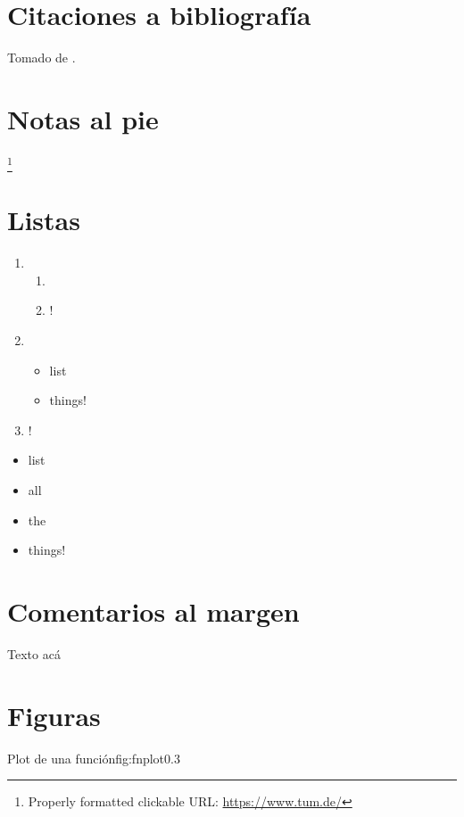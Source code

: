 
\section*{Citaciones a bibliografía}
\tinylipsum Tomado de \cite{latex}.

\section*{Notas al pie}
\tinylipsum \footnote{Properly formatted clickable URL: \url{https://www.tum.de/}}

\section*{Listas}
\tinylipsum

\tinylipsum
\begin{enumerate}
  \item \tinylipsum
    \begin{enumerate}
      \item \tinylipsum
      \item \tinylipsum!
    \end{enumerate}
  \item \tinylipsum
    \begin{itemize}
      \item list
      \item things!
    \end{itemize}
  \item \tinylipsum!
\end{enumerate}

\begin{itemize}
  \item list
  \item all
  \item the
  \item things!
\end{itemize}
\tinylipsum

\section*{Comentarios al margen}
Texto acá  \blindtext

\section*{Figuras}
\tinylipsum
{}%
{Plot de una función}{fig:fnplot}{0.3}
\tinylipsum

